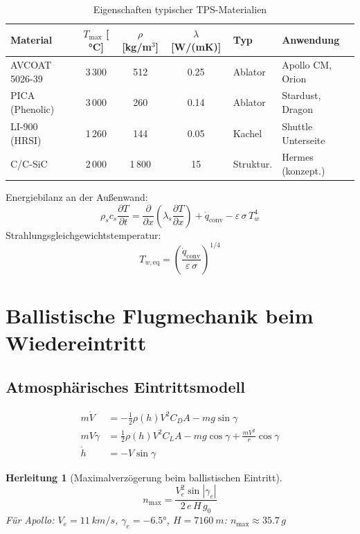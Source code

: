﻿\documentclass[12pt,a4paper]{article}
\newtheorem{herleitung}{Herleitung}[section]
\begin{document}
\begin{table}[H]
\centering
\caption{Eigenschaften typischer TPS-Materialien}
\label{tab:tps_mat}
\begin{tabular}{lcccll}
\toprule
\textbf{Material} & $T_{\max}$ [ °C] & $\rho$ [kg/m$^3$] &
$\lambda$ [W/(mK)] & \textbf{Typ} & \textbf{Anwendung}\\
\midrule
AVCOAT 5026-39    & 3\,300 & 512  & 0.25 & Ablator    & Apollo CM, Orion\\
PICA (Phenolic)   & 3\,000 & 260  & 0.14 & Ablator    & Stardust, Dragon\\
LI-900 (HRSI)     & 1\,260 & 144  & 0.05 & Kachel     & Shuttle Unterseite\\
C/C-SiC           & 2\,000 & 1\,800 & 15  & Struktur. & Hermes (konzept.)\\
\bottomrule
\end{tabular}
\end{table}

Energiebilanz an der Außenwand:
\[
  \rho_s c_s \frac{\partial T}{\partial t}
    = \frac{\partial}{\partial x}\!\left(\lambda_s \frac{\partial T}{\partial x}\right)
    + \dot{q}_{\mathrm{conv}} - \varepsilon\,\sigma\,T_w^4
\]
Strahlungsgleichgewichtstemperatur:
\[
  T_{w,\mathrm{eq}} = \left(\frac{\dot{q}_{\mathrm{conv}}}{\varepsilon\,\sigma}\right)^{1/4}
\]

\section{Ballistische Flugmechanik beim Wiedereintritt}

\subsection{Atmosphärisches Eintrittsmodell}

\begin{align}
  m\dot{V} &= -\frac{1}{2}\rho(h) V^2 C_D A - mg\sin\gamma\\
  mV\dot{\gamma} &= \frac{1}{2}\rho(h) V^2 C_L A - mg\cos\gamma
    + \frac{mV^2}{r}\cos\gamma\\
  \dot{h} &= -V\sin\gamma
\end{align}

\begin{herleitung}[Maximalverzögerung beim ballistischen Eintritt]
\[
  \boxed{n_{\max} = \frac{V_e^2\sin|\gamma_e|}{2\,e\,H\,g_0}}
\]
Für Apollo: $V_e = \SI{11}{km/s}$, $\gamma_e = -6.5 °$, $H = \SI{7160}{m}$:
$n_{\max} \approx 35.7\,g$
\end{herleitung}
\end{document}

